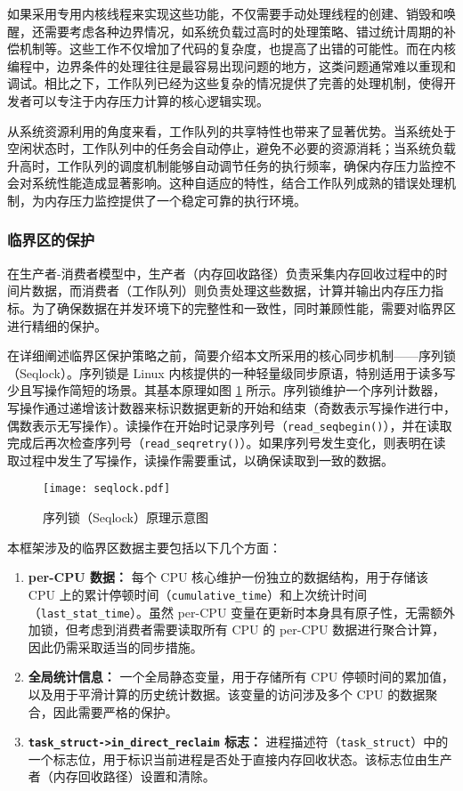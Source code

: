 如果采用专用内核线程来实现这些功能，不仅需要手动处理线程的创建、销毁和唤醒，还需要考虑各种边界情况，如系统负载过高时的处理策略、错过统计周期的补偿机制等。这些工作不仅增加了代码的复杂度，也提高了出错的可能性。而在内核编程中，边界条件的处理往往是最容易出现问题的地方，这类问题通常难以重现和调试。相比之下，工作队列已经为这些复杂的情况提供了完善的处理机制，使得开发者可以专注于内存压力计算的核心逻辑实现。

从系统资源利用的角度来看，工作队列的共享特性也带来了显著优势。当系统处于空闲状态时，工作队列中的任务会自动停止，避免不必要的资源消耗；当系统负载升高时，工作队列的调度机制能够自动调节任务的执行频率，确保内存压力监控不会对系统性能造成显著影响。这种自适应的特性，结合工作队列成熟的错误处理机制，为内存压力监控提供了一个稳定可靠的执行环境。


\subsubsection{临界区的保护}

在生产者-消费者模型中，生产者（内存回收路径）负责采集内存回收过程中的时间片数据，而消费者（工作队列）则负责处理这些数据，计算并输出内存压力指标。为了确保数据在并发环境下的完整性和一致性，同时兼顾性能，需要对临界区进行精细的保护。

在详细阐述临界区保护策略之前，简要介绍本文所采用的核心同步机制——序列锁（Seqlock）。序列锁是 Linux 内核提供的一种轻量级同步原语，特别适用于读多写少且写操作简短的场景。其基本原理如图 \ref{fig:seqlock} 所示。序列锁维护一个序列计数器，写操作通过递增该计数器来标识数据更新的开始和结束（奇数表示写操作进行中，偶数表示无写操作）。读操作在开始时记录序列号（\texttt{read\_seqbegin()}），并在读取完成后再次检查序列号（\texttt{read\_seqretry()}）。如果序列号发生变化，则表明在读取过程中发生了写操作，读操作需要重试，以确保读取到一致的数据。

\begin{figure}[H]
    \centering
    \texttt{[image: seqlock.pdf]}
    \caption{序列锁（Seqlock）原理示意图}
    \label{fig:seqlock}
\end{figure}

本框架涉及的临界区数据主要包括以下几个方面：

\begin{enumerate}
    \item \textbf{per-CPU 数据：} 每个 CPU 核心维护一份独立的数据结构，用于存储该 CPU 上的累计停顿时间（\texttt{cumulative\_time}）和上次统计时间（\texttt{last\_stat\_time}）。虽然 per-CPU 变量在更新时本身具有原子性，无需额外加锁，但考虑到消费者需要读取所有 CPU 的 per-CPU 数据进行聚合计算，因此仍需采取适当的同步措施。

    \item \textbf{全局统计信息：} 一个全局静态变量，用于存储所有 CPU 停顿时间的累加值，以及用于平滑计算的历史统计数据。该变量的访问涉及多个 CPU 的数据聚合，因此需要严格的保护。

    \item \textbf{\texttt{task\_struct->in\_direct\_reclaim} 标志：} 进程描述符（\texttt{task\_struct}）中的一个标志位，用于标识当前进程是否处于直接内存回收状态。该标志位由生产者（内存回收路径）设置和清除。
\end{enumerate}

